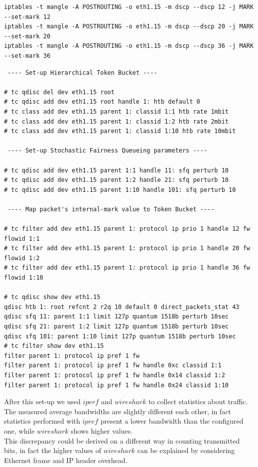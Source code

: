 \documentclass{llncs}
\begin{document}
\lstset{language=sh, caption=From DSCP to internal-marking (netlab15), basicstyle=\ttfamily\scriptsize , breaklines=true}
\begin{lstlisting}
iptables -t mangle -A POSTROUTING -o eth1.15 -m dscp --dscp 12 -j MARK --set-mark 12
iptables -t mangle -A POSTROUTING -o eth1.15 -m dscp --dscp 20 -j MARK --set-mark 20
iptables -t mangle -A POSTROUTING -o eth1.15 -m dscp --dscp 36 -j MARK --set-mark 36
\end{lstlisting}

\lstset{language=sh, caption=Configuration of the traffic shaper (netlab15), basicstyle=\ttfamily\scriptsize , breaklines=true}
\begin{lstlisting}
 ---- Set-up Hierarchical Token Bucket ---- 
 
# tc qdisc del dev eth1.15 root
# tc qdisc add dev eth1.15 root handle 1: htb default 0
# tc class add dev eth1.15 parent 1: classid 1:1 htb rate 1mbit
# tc class add dev eth1.15 parent 1: classid 1:2 htb rate 2mbit
# tc class add dev eth1.15 parent 1: classid 1:10 htb rate 10mbit

 ---- Set-up Stochastic Fairness Queueing parameters ---- 
 
# tc qdisc add dev eth1.15 parent 1:1 handle 11: sfq perturb 10
# tc qdisc add dev eth1.15 parent 1:2 handle 21: sfq perturb 10
# tc qdisc add dev eth1.15 parent 1:10 handle 101: sfq perturb 10

 ---- Map packet's internal-mark value to Token Bucket ---- 
 
# tc filter add dev eth1.15 parent 1: protocol ip prio 1 handle 12 fw flowid 1:1
# tc filter add dev eth1.15 parent 1: protocol ip prio 1 handle 20 fw flowid 1:2
# tc filter add dev eth1.15 parent 1: protocol ip prio 1 handle 36 fw flowid 1:10

# tc qdisc show dev eth1.15
qdisc htb 1: root refcnt 2 r2q 10 default 0 direct_packets_stat 43
qdisc sfq 11: parent 1:1 limit 127p quantum 1518b perturb 10sec 
qdisc sfq 21: parent 1:2 limit 127p quantum 1518b perturb 10sec 
qdisc sfq 101: parent 1:10 limit 127p quantum 1518b perturb 10sec 
# tc filter show dev eth1.15
filter parent 1: protocol ip pref 1 fw 
filter parent 1: protocol ip pref 1 fw handle 0xc classid 1:1 
filter parent 1: protocol ip pref 1 fw handle 0x14 classid 1:2 
filter parent 1: protocol ip pref 1 fw handle 0x24 classid 1:10 
\end{lstlisting}

After this set-up we used $iperf$ and $wireshark$ to collect statistics about traffic. The measured average bandwidths are slightly different each other, in fact statistics performed with $ipref$ present a lower bandwidth than the configured one, while $wireshark$ shows higher values.\\
This discrepancy could be derived on a different way in counting transmitted bits, in fact the higher values of $wireshark$ can be explained by considering Ethernet frame and IP header overhead.\\
 
\end{document}
